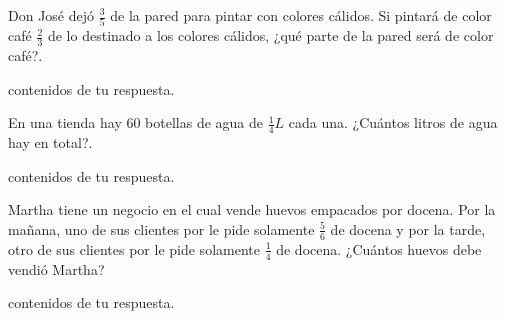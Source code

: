 \documentclass[12pt]{examdesign}
\theoremstyle{plain}
\theoremstyle{definition}
\theoremstyle{remark}
\begin{document}
	\begin{shortanswer}[title={Pensar cómo resolver las situaciones problemáticas aplicando fracciones...},
		rearrange=no,resetcounter=yes]
		
	    \begin{question}
	    	Don José dejó  $\displaystyle{\frac{3}{5}}$ de la pared para pintar con colores cálidos. Si pintará de color café  $\displaystyle{\frac{2}{3}}$ de lo destinado a los colores cálidos, ¿qué parte de la pared será de color café?.
	    	
	    	\hrulefill
	    	\begin{answer}
	    		contenidos de tu respuesta.
	    	\end{answer}
	    \end{question}
        
        \begin{question}
        	En una tienda hay $60$ botellas de agua de $\displaystyle{\frac{1}{4}}L$ cada una. ¿Cuántos litros de agua hay en total?.
        	
        	\hrulefill
        	\begin{answer}
        		contenidos de tu respuesta.
        	\end{answer}
        \end{question}
    
        \begin{question}
        	Martha tiene un negocio en el cual vende huevos empacados por docena. Por la mañana, uno de sus clientes por le pide solamente $\displaystyle{\frac{5}{6}}$ de docena y por la tarde, otro de sus clientes por le pide solamente $\displaystyle{\frac{1}{4}}$ de docena. ¿Cuántos huevos debe vendió Martha?
        	
        	\hrulefill
        	\begin{answer}
        		contenidos de tu respuesta.
        	\end{answer}
        \end{question}
	\end{shortanswer}
\end{document}
